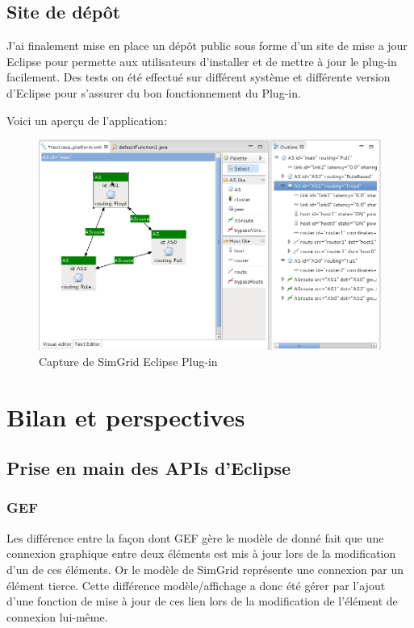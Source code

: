 \documentclass{article}
\begin{document}
    \subsection{Site de dépôt}
    J'ai finalement mise en place un dépôt public sous forme d'un site de mise a jour Eclipse pour permette aux utilisateurs d'installer et de mettre à jour le plug-in facilement. Des tests on été effectué sur différent système et différente version d'Eclipse pour s'assurer du bon fonctionnement du Plug-in. 
    
    Voici un aperçu de l'application: 
    \begin{figure}[!h]
		  \centering
		  \includegraphics[scale=0.4]{img/CaptureSimGridEclipseVisualEditor.png}
		  \caption{Capture de SimGrid Eclipse Plug-in}
		\end{figure}


\section{Bilan et perspectives}
    \subsection{Prise en main des APIs d'Eclipse}
        \subsubsection{GEF}
        Les différence entre la façon dont GEF gère le modèle de donné fait que une connexion graphique entre deux éléments est mis à jour lors de la modification d'un de ces éléments. Or le modèle de SimGrid représente une connexion par un élément tierce. Cette différence modèle/affichage a donc été gérer par l'ajout d'une fonction de mise à jour de ces lien lors de la modification de l'élément de connexion lui-même.
\end{document}
